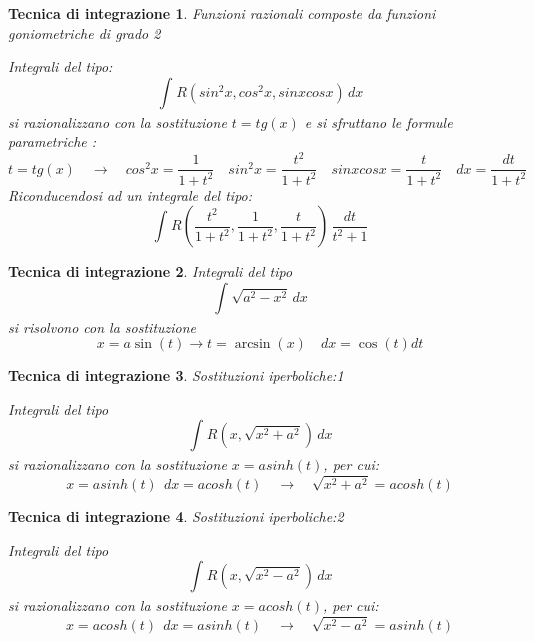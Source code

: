 \documentclass[a4paper, titlepage]{report}%
\theoremstyle{definition} %
\theoremstyle{plain}
\theoremstyle{plain}
\theoremstyle{remark}
\theoremstyle{remark}
\theoremstyle{plain}
\theoremstyle{plain}
\theoremstyle{plain}
\theoremstyle{plain}
\theoremstyle{plain}
\newtheorem*{tecnica}{Tecnica di integrazione}
\begin{document}
\begin{tecnica}{Funzioni razionali composte da funzioni goniometriche di grado 2}
   
    Integrali del tipo:
\[
     \int_{}^{} R(sin^2x,cos^2x,sinxcosx) \,dx         
\]
si razionalizzano con la sostituzione $t = tg(x)$ e si sfruttano le formule parametriche
:
\[
  t = tg(x) \quad \rightarrow \quad cos^2x = \frac{1}{1+t^2} \quad sin^2x = \frac{t^2}{1+t^2}
  \quad sinxcosx = \frac{t}{1+t^2} \quad dx = \frac{dt}{1+t^2}
\]
Riconducendosi ad un integrale del tipo:
\[
    \int_{}^{} R(\frac{t^2}{1+t^2},\frac{1}{1+t^2},\frac{t}{1+t^2}) \,\frac{dt}{t^2+1}  
\]
\end{tecnica}

\begin{tecnica}{}


    Integrali del tipo
\[
    \int_{}^{} \sqrt{a^2-x^2}\,dx
\]
si risolvono con la sostituzione
\[
   x = a \sin(t) \rightarrow t = \arcsin(x) \quad dx = \cos(t) dt
\]
\end{tecnica}

\begin{tecnica}{Sostituzioni iperboliche:1}

    Integrali del tipo 
    \[
        \int_{}^{} R(x, \sqrt{x^2+a^2}) \,dx         
    \]
    si razionalizzano con la sostituzione $x = asinh(t)$, per cui:
    \[
        x = asinh(t) \ \  dx = a cosh(t) \quad  \rightarrow \quad 
        \sqrt{x^2+a^2} = a cosh(t) 
    \]

\end{tecnica}
\begin{tecnica}{Sostituzioni iperboliche:2}

    Integrali del tipo 
    \[
        \int_{}^{} R(x, \sqrt{x^2 - a^2}) \,dx         
    \]
    si razionalizzano con la sostituzione $x = acosh(t)$, per cui:
    \[
        x = a cosh(t) \ \  dx = a sinh(t) \quad  \rightarrow \quad 
        \sqrt{x^2 - a^2} = a sinh(t) 
    \]
\end{tecnica}
\end{document}
